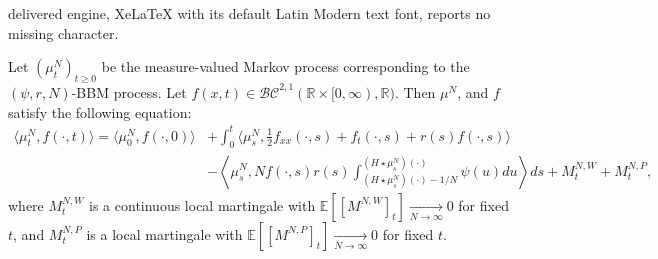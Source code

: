 \documentclass[10pt,a4paper]{amsart}
\newcommand{\B}[1]{\mathbb{#1}}
\newcommand{\C}[1]{\mathcal{#1}}
\begin{document}
delivered engine, XeLaTeX with its default Latin Modern text font, reports no missing character.
\begin{propn} \label{weakRepPropn}
    Let $(\mu_t^N)_{t\geq 0}$ be the measure-valued Markov process corresponding to the $(\psi,r,N)$-BBM process. Let $f(x,t)\in \C{BC}^{2,1}(\B{R}\times [0,\infty),\B{R})$. Then $\mu^N$, and $f$ satisfy the following equation:
    \begin{align}\label{weakRep}\langle \mu_t^N,f(\cdot,t)\rangle = \langle \mu_0^N, f(\cdot,0)\rangle &+ \int_0^t \langle \mu_s^N, \frac12 f_{xx}(\cdot,s) + f_t(\cdot,s) + r(s)f(\cdot,s)\rangle \\
    \nonumber&-\left\langle \mu_s^N, Nf(\cdot,s)r(s)\int_{(H\star \mu^N_s)(\cdot)-1/N}^{(H\star \mu^N_s)(\cdot)}\psi(u)du\right\rangle ds + M_t^{N,W} + M_t^{N,P},\end{align}
    where $M^{N,W}_t$ is a continuous local martingale with $\B{E}[[M^{N,W}]_t]\xrightarrow[N\to\infty]{}0$ for fixed $t$, and $M^{N,P}_t$ is a local martingale with $\B{E}[[M^{N,P}]_t]\xrightarrow[N\to\infty]{}0$ for fixed $t$.
\end{propn}
\end{document}
